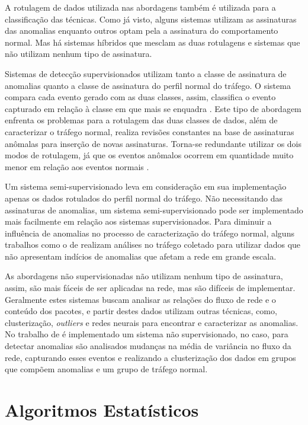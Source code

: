 \indent A rotulagem de dados utilizada nas abordagens também é utilizada para a classificação das técnicas. Como já visto, alguns sistemas utilizam as assinaturas das anomalias enquanto outros optam pela a assinatura do comportamento normal. Mas há sistemas híbridos que mesclam as duas rotulagens e sistemas que não utilizam nenhum tipo de assinatura.

\indent Sistemas de detecção supervisionados utilizam tanto a classe de assinatura de anomalias quanto a classe de assinatura do perfil normal do tráfego. O sistema compara cada evento gerado com as duas classes, assim, classifica o evento capturado em relação à classe em que mais se enquadra \cite{chandola2009}. Este tipo de abordagem enfrenta os problemas para a rotulagem das duas classes de dados, além de caracterizar o tráfego normal, realiza revisões constantes na base de assinaturas anômalas para inserção de novas assinaturas. Torna-se redundante utilizar os dois modos de rotulagem, já que os eventos anômalos ocorrem em quantidade muito menor em relação aos eventos normais \cite{Bhuyan}.

\indent Um sistema semi-supervisionado leva em consideração em sua implementação apenas os dados rotulados do perfil normal do tráfego. Não necessitando das assinaturas de anomalias, um sistema semi-supervisionado pode ser implementado mais facilmente em relação aos sistemas supervisionados. Para diminuir a influência de anomalias no processo de caracterização do tráfego normal, alguns trabalhos como o de  realizam análises no tráfego coletado para utilizar dados que não apresentam indícios de anomalias que afetam a rede em grande escala.

\indent As abordagens não supervisionadas não utilizam nenhum tipo de assinatura, assim, são mais fáceis de ser aplicadas na rede, mas são difíceis de implementar. Geralmente estes sistemas buscam analisar as relações do fluxo de rede e o conteúdo dos pacotes, e partir destes dados utilizam outras técnicas, como, clusterização, \textit{outliers} e redes neurais para encontrar e caracterizar as anomalias. No trabalho de  é implementado um sistema não supervisionado, no caso, para detectar anomalias são analisados mudanças na média de variância no fluxo da rede, capturando esses eventos e realizando a clusterização dos dados em grupos que compõem anomalias e um grupo de tráfego normal.


  \section{Algoritmos Estatísticos}

